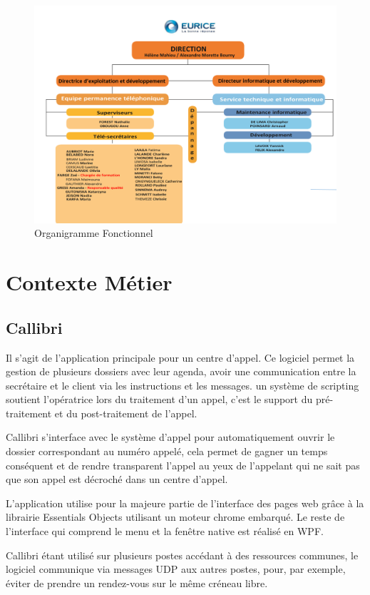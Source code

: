\begin{figure}[h]
	\centering
	\includegraphics[width=0.7\linewidth]{Images/organigramme_fonctionnel}
	\caption{Organigramme Fonctionnel}
	\label{fig:organigrammefonctionnel}
\end{figure}

\section{Contexte Métier}

\subsection{Callibri}
Il s'agit de l'application principale pour un centre d'appel. 
Ce logiciel permet la gestion de plusieurs dossiers avec leur agenda, 
avoir une communication entre la secrétaire et le client via les instructions et les messages. 
un système de scripting soutient l'opératrice lors du traitement d'un appel, 
c'est le support du pré-traitement et du post-traitement de l'appel. \newline

\gls{Callibri} s'interface avec le système d'appel pour automatiquement ouvrir le dossier correspondant 
au numéro appelé, cela permet de gagner un temps conséquent 
et de rendre transparent l'appel au yeux de l'appelant qui ne sait pas 
que son appel est décroché dans un centre d'appel. \newline


L'application utilise pour la majeure partie de l'interface des pages web grâce 
à la librairie Essentials Objects utilisant un moteur chrome embarqué.
Le reste de l'interface qui comprend le menu et la fenêtre native est réalisé en WPF.
\newline


\gls{Callibri} étant utilisé sur plusieurs postes accédant à des ressources communes, 
le logiciel communique via messages UDP aux autres postes, pour, par exemple, éviter de prendre 
un rendez-vous sur le même créneau libre.


